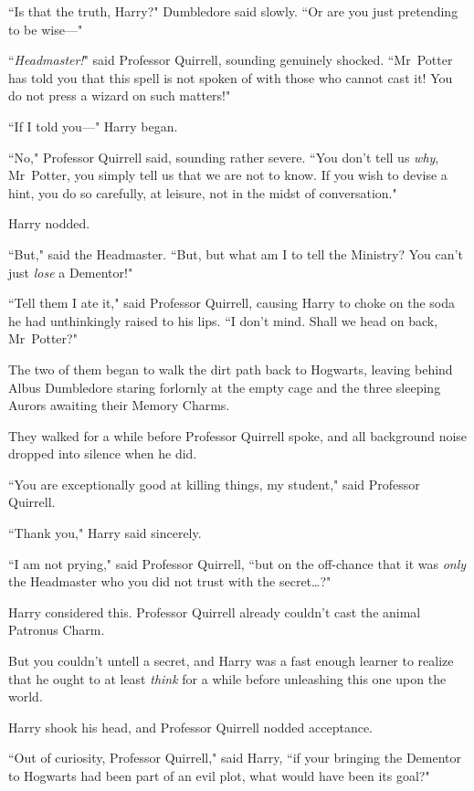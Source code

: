 ``Is that the truth, Harry?" Dumbledore said slowly. ``Or are you just pretending to be wise—"

``\emph{Headmaster!}" said Professor Quirrell, sounding genuinely shocked. ``Mr~Potter has told you that this spell is not spoken of with those who cannot cast it! You do not press a wizard on such matters!"

``If I told you—" Harry began.

``No," Professor Quirrell said, sounding rather severe. ``You don't tell us \emph{why}, Mr~Potter, you simply tell us that we are not to know. If you wish to devise a hint, you do so carefully, at leisure, not in the midst of conversation."

Harry nodded.

``But," said the Headmaster. ``But, but what am I to tell the Ministry? You can't just \emph{lose} a Dementor!"

``Tell them I ate it," said Professor Quirrell, causing Harry to choke on the soda he had unthinkingly raised to his lips. ``I don't mind. Shall we head on back, Mr~Potter?"

The two of them began to walk the dirt path back to Hogwarts, leaving behind Albus Dumbledore staring forlornly at the empty cage and the three sleeping Aurors awaiting their Memory Charms.


They walked for a while before Professor Quirrell spoke, and all background noise dropped into silence when he did.

``You are exceptionally good at killing things, my student," said Professor Quirrell.

``Thank you," Harry said sincerely.

``I am not prying," said Professor Quirrell, ``but on the off-chance that it was \emph{only} the Headmaster who you did not trust with the secret…?"

Harry considered this. Professor Quirrell already couldn't cast the animal Patronus Charm.

But you couldn't untell a secret, and Harry was a fast enough learner to realize that he ought to at least \emph{think} for a while before unleashing this one upon the world.

Harry shook his head, and Professor Quirrell nodded acceptance.

``Out of curiosity, Professor Quirrell," said Harry, ``if your bringing the Dementor to Hogwarts had been part of an evil plot, what would have been its goal?"

